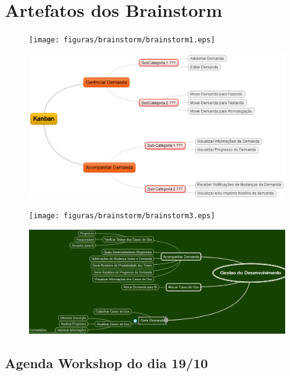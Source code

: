 \chapter[Artefatos dos Brainstorm]{Artefatos dos Brainstorm} \label{apendices:brainstorms}

\begin{figure}[H]
	\centering
	\texttt{[image: figuras/brainstorm/brainstorm1.eps]}
	\caption{}
	\label{}
\end{figure}

\begin{figure}[H]
	\centering
	\includegraphics[keepaspectratio=true,scale=0.8]{figuras/brainstorm/brainstorm2.eps}
	\caption{}
	\label{}
\end{figure}

\begin{figure}[H]
	\centering
	\texttt{[image: figuras/brainstorm/brainstorm3.eps]}
	\caption{}
	\label{}
\end{figure}

\begin{figure}[H]
	\centering
	\includegraphics[keepaspectratio=true,scale=0.6]{figuras/brainstorm/brainstorm4.eps}
	\caption{}
	\label{}
\end{figure}

\section{Agenda Workshop do dia 19/10}

